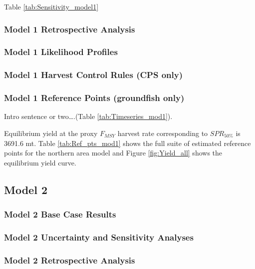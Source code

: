 \documentclass[12pt,]{article}
\begin{document}
Table \ref{tab:Sensitivity_model1}

\subsubsection{Model 1 Retrospective
Analysis}\label{model-1-retrospective-analysis}

\subsubsection{Model 1 Likelihood
Profiles}\label{model-1-likelihood-profiles}

\subsubsection{Model 1 Harvest Control Rules (CPS
only)}\label{model-1-harvest-control-rules-cps-only}

\subsubsection{Model 1 Reference Points (groundfish
only)}\label{model-1-reference-points-groundfish-only}

Intro sentence or two\ldots{}.(Table \ref{tab:Timeseries_mod1}).

Equilibrium yield at the proxy \(F_{MSY}\) harvest rate corresponding to
\(SPR_{50\%}\) is 3691.6 mt. Table \ref{tab:Ref_pts_mod1} shows the full
suite of estimated reference points for the northern area model and
Figure \ref{fig:Yield_all} shows the equilibrium yield curve.

\subsection{Model 2}\label{model-2}

\subsubsection{Model 2 Base Case
Results}\label{model-2-base-case-results}

\subsubsection{Model 2 Uncertainty and Sensitivity
Analyses}\label{model-2-uncertainty-and-sensitivity-analyses}

\subsubsection{Model 2 Retrospective
Analysis}\label{model-2-retrospective-analysis}
\end{document}
